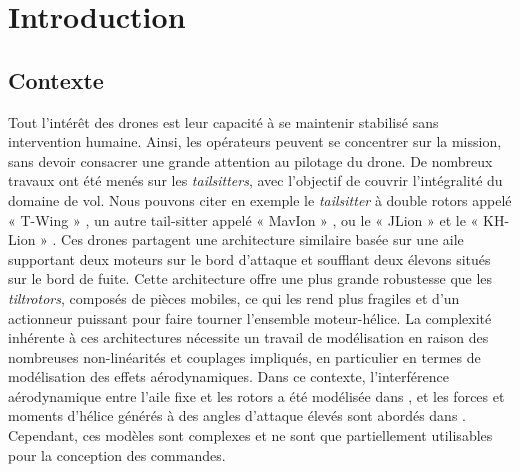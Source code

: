 \chapter*{Introduction}


\section*{Contexte}
Tout l'intérêt des drones est leur capacité à se maintenir stabilisé sans intervention humaine. Ainsi, les opérateurs peuvent se concentrer sur la mission, sans devoir consacrer une grande attention au pilotage du drone. 
De nombreux travaux ont été menés sur les \textit{tailsitters}, avec l'objectif de couvrir l'intégralité du domaine de vol. 
Nous pouvons citer en exemple le \textit{tailsitter} à double rotors appelé « T-Wing » \cite{Stone2002PreliminaryDO, TWing2008}, un autre tail-sitter appelé « MavIon » \cite{oatao14575}, ou le « JLion » et le « KH-Lion » \cite{8003167}. Ces drones partagent une architecture similaire basée sur une aile supportant deux moteurs sur le bord d'attaque et soufflant deux élevons situés sur le bord de fuite. Cette architecture offre une plus grande robustesse que les \textit{tiltrotors}, composés de pièces mobiles, ce qui les rend plus fragiles et d'un actionneur puissant pour faire tourner l'ensemble moteur-hélice.
La complexité inhérente à ces architectures nécessite un travail de modélisation en raison des nombreuses non-linéarités et couplages impliqués, en particulier en termes de modélisation des effets aérodynamiques. Dans ce contexte, l'interférence aérodynamique entre l'aile fixe et les rotors a été modélisée dans \cite{droandi_zanotti_gibertini_grassi_campanardi_2015, Simmons2022, aerospace5030079}, et les forces et moments d'hélice générés à des angles d'attaque élevés sont abordés dans \cite{Fernandez2023}. Cependant, ces modèles sont complexes et ne sont que partiellement utilisables pour la conception des commandes. 

